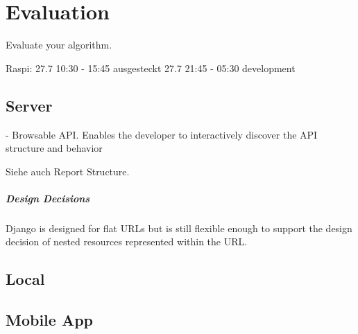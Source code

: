 \chapter{Evaluation}
\label{sec:evaluation}

Evaluate your algorithm.

Raspi: 27.7 10:30 - 15:45 ausgesteckt
27.7 21:45 - 05:30 development

\section{Server}

- Browsable API. Enables the developer to interactively discover the API structure and behavior

Siehe auch Report Structure.


\paragraph{Design Decisions}

Django is designed for flat URLs but is still flexible enough to support the design decision of nested resources represented within the URL.

\section{Local}


\section{Mobile App}
